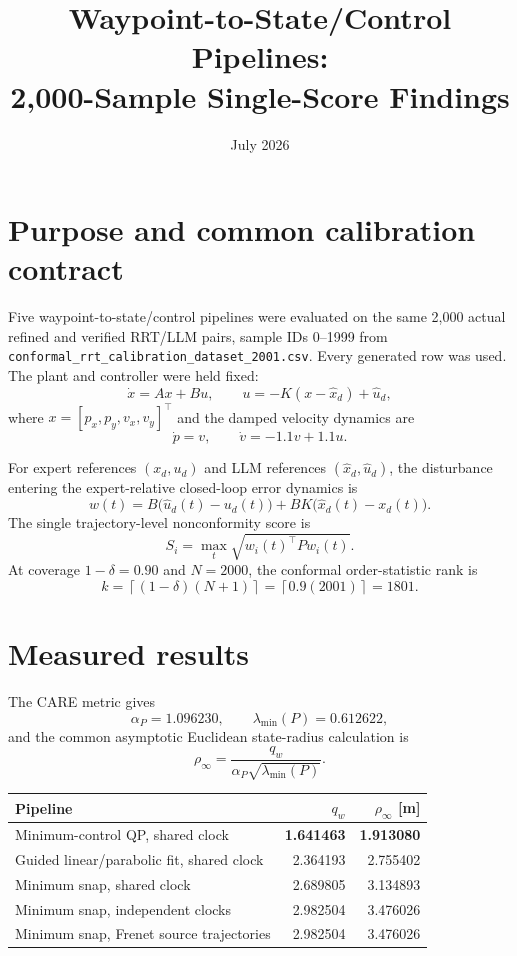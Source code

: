 \documentclass[11pt]{article}
\title{Waypoint-to-State/Control Pipelines:\\2,000-Sample Single-Score Findings}
\author{}
\date{July 2026}
\begin{document}
\maketitle

\section*{Purpose and common calibration contract}
Five waypoint-to-state/control pipelines were evaluated on the same 2,000 actual refined and verified RRT/LLM pairs, sample IDs 0--1999 from \texttt{conformal\_rrt\_calibration\_dataset\_2001.csv}.  Every generated row was used.  The plant and controller were held fixed:
\[
\dot x=Ax+Bu,\qquad
u=-K(x-\hat x_d)+\hat u_d,
\]
where $x=[p_x,p_y,v_x,v_y]^\top$ and the damped velocity dynamics are
\[
\dot p=v,\qquad \dot v=-1.1v+1.1u.
\]

For expert references $(x_d,u_d)$ and LLM references $(\hat x_d,\hat u_d)$, the disturbance entering the expert-relative closed-loop error dynamics is
\[
w(t)=B\bigl(\hat u_d(t)-u_d(t)\bigr)
      +BK\bigl(\hat x_d(t)-x_d(t)\bigr).
\]
The single trajectory-level nonconformity score is
\[
S_i=\max_t\sqrt{w_i(t)^\top P w_i(t)}.
\]
At coverage $1-\delta=0.90$ and $N=2000$, the conformal order-statistic rank is
\[
k=\left\lceil(1-\delta)(N+1)\right\rceil
 =\left\lceil0.9(2001)\right\rceil=1801.
\]

\section*{Measured results}
The CARE metric gives
\[
\alpha_P=1.096230,\qquad \lambda_{\min}(P)=0.612622,
\]
and the common asymptotic Euclidean state-radius calculation is
\[
\rho_\infty=\frac{q_w}{\alpha_P\sqrt{\lambda_{\min}(P)}}.
\]

\begin{center}
\begin{tabular}{>{\raggedright\arraybackslash}p{7.3cm}rr}
\toprule
Pipeline & $q_w$ & $\rho_\infty$ [m]\\
\midrule
Minimum-control QP, shared clock & \textbf{1.641463} & \textbf{1.913080}\\
Guided linear/parabolic fit, shared clock & 2.364193 & 2.755402\\
Minimum snap, shared clock & 2.689805 & 3.134893\\
Minimum snap, independent clocks & 2.982504 & 3.476026\\
Minimum snap, Frenet source trajectories & 2.982504 & 3.476026\\
\bottomrule
\end{tabular}
\end{center}
\end{document}
